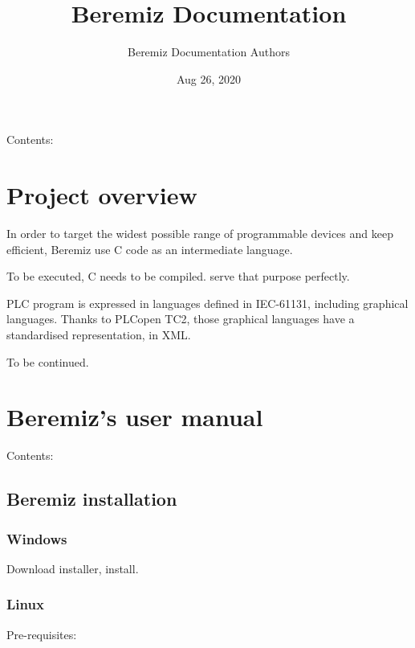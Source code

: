 \documentclass[letterpaper,10pt,english]{sphinxmanual}
\title{Beremiz Documentation}
\date{Aug 26, 2020}
\author{Beremiz Documentation Authors}
\begin{document}
\maketitle
\sphinxtableofcontents
{}\label{\detokenize{index::doc}}


Contents:


\chapter{Project overview}
\label{\detokenize{overview:project-overview}}\label{\detokenize{overview::doc}}\label{\detokenize{overview:beremiz-s-documentation}}
In order to target the widest possible range of programmable devices and keep efficient, Beremiz use C code as an intermediate language.

To be executed, C needs to be compiled.  serve that purpose perfectly.

PLC program is expressed in languages defined in IEC-61131, including graphical languages. Thanks to PLCopen TC2, those graphical languages have a standardised representation, in XML.

To be continued.


\chapter{Beremiz’s user manual}
\label{\detokenize{manual/index:beremiz-s-user-manual}}\label{\detokenize{manual/index::doc}}
Contents:


\section{Beremiz installation}
\label{\detokenize{manual/install::doc}}\label{\detokenize{manual/install:beremiz-installation}}

\subsection{Windows}
\label{\detokenize{manual/install:windows}}
Download installer, install.


\subsection{Linux}
\label{\detokenize{manual/install:linux}}
Pre-requisites:

%
\begin{sphinxVerbatim}[commandchars=\\\{\}]
     
       
\end{sphinxVerbatim}
\end{document}
